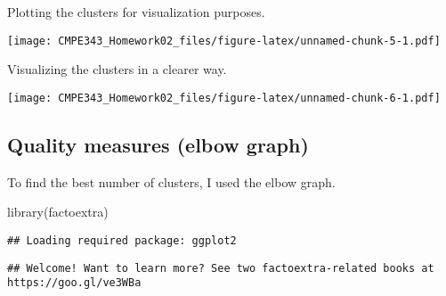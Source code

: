 \documentclass[
]{article}
\newenvironment{Shaded}{\begin{snugshade}}{\end{snugshade}}
\newcommand{\AttributeTok}[1]{\textcolor[rgb]{0.77,0.63,0.00}{#1}}
\newcommand{\ConstantTok}[1]{\textcolor[rgb]{0.00,0.00,0.00}{#1}}
\newcommand{\DecValTok}[1]{\textcolor[rgb]{0.00,0.00,0.81}{#1}}
\newcommand{\FunctionTok}[1]{\textcolor[rgb]{0.00,0.00,0.00}{#1}}
\newcommand{\NormalTok}[1]{#1}
\newcommand{\SpecialCharTok}[1]{\textcolor[rgb]{0.00,0.00,0.00}{#1}}
\newcommand{\StringTok}[1]{\textcolor[rgb]{0.31,0.60,0.02}{#1}}
\begin{document}
Plotting the clusters for visualization purposes.

\begin{Shaded}
\end{Shaded}

\texttt{[image: CMPE343\_Homework02\_files/figure-latex/unnamed-chunk-5-1.pdf]}

Visualizing the clusters in a clearer way.

\begin{Shaded}
\end{Shaded}

\texttt{[image: CMPE343\_Homework02\_files/figure-latex/unnamed-chunk-6-1.pdf]}

\hypertarget{quality-measures-elbow-graph}{%
\subsection{Quality measures (elbow
graph)}\label{quality-measures-elbow-graph}}

To find the best number of clusters, I used the elbow graph.

\begin{Shaded}
\begin{Highlighting}[]
\FunctionTok{library}\NormalTok{(}\StringTok{\textquotesingle{}factoextra\textquotesingle{}}\NormalTok{)}
\end{Highlighting}
\end{Shaded}

\begin{verbatim}
## Loading required package: ggplot2
\end{verbatim}

\begin{verbatim}
## Welcome! Want to learn more? See two factoextra-related books at https://goo.gl/ve3WBa
\end{verbatim}
\end{document}
